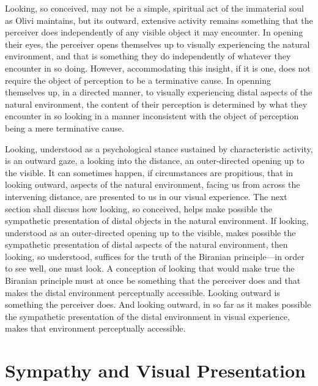 Looking, so conceived, may not be a simple, spiritual act of the immaterial soul as Olivi maintains, but its outward, extensive activity remains something that the perceiver does independently of any visible object it may encounter. In opening their eyes, the perceiver opens themselves up to visually experiencing the natural environment, and that is something they do independently of whatever they encounter in so doing. However, accommodating this insight, if it is one, does not require the object of perception to be a terminative cause. In openning themselves up, in a directed manner, to visually experiencing distal aspects of the natural environment, the content of their perception is determined by what they encounter in so looking in a manner inconsistent with the object of perception being a mere terminative cause.

Looking, understood as a psychological stance sustained by characteristic activity, is an outward gaze, a looking into the distance, an outer-directed opening up to the visible. It can sometimes happen, if circumstances are propitious, that in looking outward, aspects of the natural environment, facing us from across the intervening distance, are presented to us in our visual experience. The next section shall discuss how looking, so conceived, helps make possible the sympathetic presentation of distal objects in the natural environment. If looking, understood as an outer-directed opening up to the visible, makes possible the sympathetic presentation of distal aspects of the natural environment, then looking, so understood, suffices for the truth of the Biranian principle---in order to see well, one must look. A conception of looking that would make true the Biranian principle must at once be something that the perceiver does and that makes the distal environment perceptually accessible. Looking outward is something the perceiver does. And looking outward, in so far as it makes possible the sympathetic presentation of the distal environment in visual experience, makes that environment perceptually accessible.


\section{Sympathy and Visual Presentation} %
\label{sec:sympathy_and_visual_presentation}

